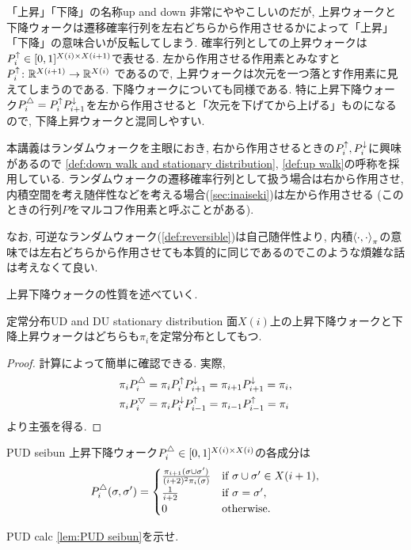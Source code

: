 \begin{remark}{「上昇」「下降」の名称}{up and down}
    非常にややこしいのだが,
    上昇ウォークと下降ウォークは遷移確率行列を左右どちらから作用させるかによって「上昇」「下降」の意味合いが反転してしまう.
    確率行列としての上昇ウォークは$P^{\uparrow}_i \in [0,1]^{X(i)\times X(i+1)}$で表せる.
    左から作用させる作用素とみなすと
    $P^{\uparrow}_i\colon \mathbb{R}^{X(i+1)} \to \mathbb{R}^{X(i)}$
    であるので, 上昇ウォークは次元を一つ落とす作用素に見えてしまうのである.
    下降ウォークについても同様である.
    特に上昇下降ウォーク$P^{\triangle}_i=P^{\uparrow}_iP^{\downarrow}_{i+1}$を左から作用させると「次元を下げてから上げる」ものになるので, 下降上昇ウォークと混同しやすい.
    
    本講義はランダムウォークを主眼におき, 右から作用させるときの$P^{\uparrow}_i,P^{\downarrow}_i$に興味があるので
    \cref{def:down walk and stationary distribution}, \ref{def:up walk}の呼称を採用している.
    ランダムウォークの遷移確率行列として扱う場合は右から作用させ, 
    内積空間を考え随伴性などを考える場合(\cref{sec:inaiseki})は左から作用させる (このときの行列$P$をマルコフ作用素と呼ぶことがある).

    なお, 可逆なランダムウォーク(\cref{def:reversible})は自己随伴性より, 内積$\left\langle\cdot,\cdot\right\rangle_{\pi}$の意味では左右どちらから作用させても本質的に同じであるのでこのような煩雑な話は考えなくて良い.
\end{remark}

上昇下降ウォークの性質を述べていく.
\begin{lemma}{定常分布}{UD and DU stationary distribution}
    面$X(i)$上の上昇下降ウォークと下降上昇ウォークはどちらも$\pi_i$を定常分布としてもつ.
\end{lemma}
\begin{proof}
    計算によって簡単に確認できる.
    実際,
    \begin{align*}
        &\pi_i P^{\triangle}_i = \pi_i P^{\uparrow}_i P^{\downarrow}_{i+1} = \pi_{i+1} P^{\downarrow}_{i+1} = \pi_i, \\
        &\pi_i P^{\bigtriangledown}_i = \pi_i P^{\downarrow}_i P^{\uparrow}_{i-1} = \pi_{i-1}P^{\uparrow}_{i-1} = \pi_i
    \end{align*}
    より主張を得る.
\end{proof}
\begin{lemma}{}{PUD seibun}
    上昇下降ウォーク$P^{\triangle}_i \in [0,1]^{X(i)\times X(i)}$の各成分は
        \[
            P^{\triangle}_i(\sigma,\sigma') = \begin{cases}
                \frac{\pi_{i+1}(\sigma\cup\sigma')}{(i+2)^2\pi_i(\sigma)}
                & \text{if } \sigma\cup\sigma'\in X(i+1),\\
                \frac{1}{i+2} & \text{if } \sigma=\sigma', \\
                0 & \text{otherwise}.
            \end{cases}
        \]
\end{lemma}
\begin{exercise}{}{PUD calc}
    \cref{lem:PUD seibun}を示せ.
\end{exercise}


